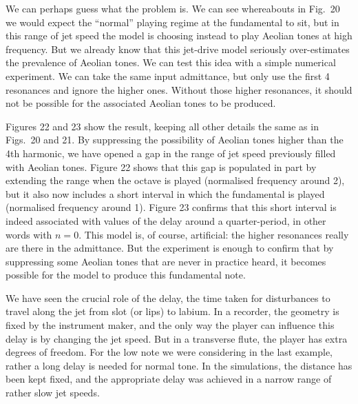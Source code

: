  We can perhaps guess what the problem is. We can see whereabouts in Fig.\ 20 
  we would expect the “normal” playing regime at the fundamental to sit, but in 
  this range of jet speed the model is choosing instead to play Aeolian tones 
  at high frequency. But we already know that this jet-drive model seriously 
  over-estimates the prevalence of Aeolian tones. We can test this idea with a 
  simple numerical experiment. We can take the same input admittance, but only 
  use the first 4 resonances and ignore the higher ones. Without those higher 
  resonances, it should not be possible for the associated Aeolian tones to be 
  produced. 

  Figures 22 and 23 show the result, keeping all other details the same as in 
  Figs.\ 20 and 21. By suppressing the possibility of Aeolian tones higher than 
  the 4th harmonic, we have opened a gap in the range of jet speed previously 
  filled with Aeolian tones. Figure 22 shows that this gap is populated in part 
  by extending the range when the octave is played (normalised frequency around 
  2), but it also now includes a short interval in which the fundamental is 
  played (normalised frequency around 1). Figure 23 confirms that this short 
  interval is indeed associated with values of the delay around a 
  quarter-period, in other words with $n=0$. This model is, of course, 
  artificial: the higher resonances really are there in the admittance. But the 
  experiment is enough to confirm that by suppressing some Aeolian tones that 
  are never in practice heard, it becomes possible for the model to produce 
  this fundamental note. 



  We have seen the crucial role of the delay, the time taken for disturbances 
  to travel along the jet from slot (or lips) to labium. In a recorder, the 
  geometry is fixed by the instrument maker, and the only way the player can 
  influence this delay is by changing the jet speed. But in a transverse flute, 
  the player has extra degrees of freedom. For the low note we were considering 
  in the last example, rather a long delay is needed for normal tone. In the 
  simulations, the distance has been kept fixed, and the appropriate delay was 
  achieved in a narrow range of rather slow jet speeds. 

